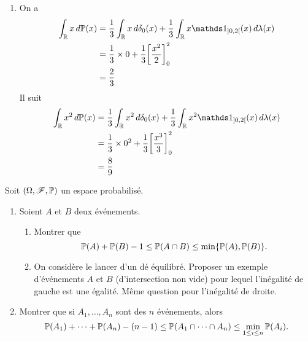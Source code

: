 {\begin{td-sol}[]
\begin{enumerate}
            \item On a
            \begin{equation*}
                \begin{aligned}
                    \int_{\bb R} x\der \bb P(x)
                    &= \frac 13 \int_{\bb R} x\der\delta_0(x) + \frac 13 \int_{\bb R} x\one_{\oo{0,2}}(x)\der\lambda(x)\\
                    &=\frac 13\times 0 + \frac 13 {\left[\frac{x^2}2\right]}_0^2\\
                    &= \frac 23
                \end{aligned}
            \end{equation*}
            Il suit
            \begin{equation*}
                \begin{aligned}
                    \int_{\bb R} x^2\der\bb P(x)
                    &= \frac 13 \int_{\bb R} x^2\der\delta_0(x) + \frac 13 \int_{\bb R} x^2\one_{\oo{0,2}}(x)\der\lambda(x)\\
                    &= \frac 13\times 0^2 + \frac 13{\left[\frac{x^3}3\right]}_0^2\\
                    &=\frac 89
                \end{aligned}
            \end{equation*}
        \end{enumerate}
    \end{td-sol}
}{}

\begin{td-exo}[] %
    Soit \((\Omega,\mathscr{F},\mathbb{P})\) un espace probabilisé.

    \begin{enumerate}
        \item Soient \(A\) et \(B\) deux événements.
        \begin{enumerate}
            \item Montrer que
            \begin{equation*}
                \mathbb{P}(A) + \mathbb{P}(B) - 1 \le \mathbb{P}(A\cap B) \le \min\{\mathbb{P}(A),\mathbb{P}(B)\}.
            \end{equation*}

            \item On considère le lancer d'un dé équilibré. Proposer
            un exemple d'événements \(A\) et \(B\) (d'intersection non vide)
            pour lequel l'inégalité de gauche est une égalité. Même question
            pour l'inégalité de droite.
        \end{enumerate}

        \item Montrer que si \(A_1,\ldots,A_n\) sont des \(n\) événements,
        alors
        \begin{equation*}
            \mathbb{P}(A_1) + \cdots + \mathbb{P}(A_n) - (n-1) \le \mathbb{P}(A_1\cap\cdots\cap A_n)
            \le \min_{1\le i\le n} \mathbb{P}(A_i).
        \end{equation*}
    \end{enumerate}
\end{td-exo}


